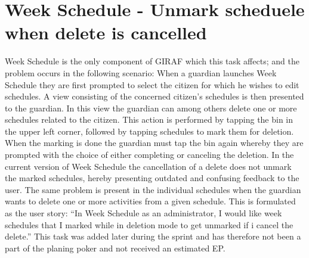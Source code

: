 \section{Week Schedule - Unmark scheduele when delete is cancelled}
Week Schedule is the only component of GIRAF which this task affects; and the problem occurs in the following scenario:
When a guardian launches Week Schedule they are first prompted to select the citizen for which he wishes to edit schedules.
A view consisting of the concerned citizen's schedules is then presented to the guardian.
In this view the guardian can among others delete one or more schedules related to the citizen.
This action is performed by tapping the bin in the upper left corner, followed by tapping schedules to mark them for deletion.
When the marking is done the guardian must tap the bin again whereby they are prompted with the choice of either completing or canceling the deletion.
In the current version of Week Schedule the cancellation of a delete does not unmark the marked schedules, hereby presenting outdated and confusing feedback to the user.
The same problem is present in the individual schedules when the guardian wants to delete one or more activities from a given schedule.
This is formulated as the user story: ``In Week Schedule as an administrator, I would like week schedules that I marked while in deletion mode to get unmarked if i cancel the delete.''
This task was added later during the sprint and has therefore not been a part of the planing poker and not received an estimated EP. 

